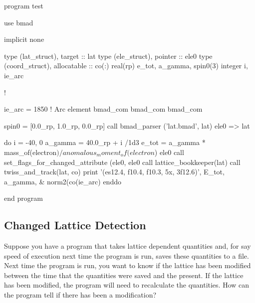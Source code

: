 \documentclass{hitec}     %
\begin{document}
\begin{code}
program test

use bmad

implicit none

type (lat_struct), target :: lat
type (ele_struct), pointer :: ele0
type (coord_struct), allocatable :: co(:)
real(rp) e_tot, a_gamma, spin0(3)
integer i, ie_arc

!

ie_arc = 1850   ! Arc element
bmad_com%
bmad_com%
bmad_com%

spin0 = [0.0_rp, 1.0_rp, 0.0_rp]
call bmad_parser ('lat.bmad', lat)
ele0 => lat%

do i = -40, 0
  a_gamma = 40.0_rp + i /1d3
  e_tot = a_gamma * mass_of(electron$) / anomalous_moment_of(electron$)
  ele0%
  call set_flags_for_changed_attribute (ele0, ele0%
  call lattice_bookkeeper(lat)
  call twiss_and_track(lat, co)
  print '(es12.4, f10.4, f10.3, 5x, 3f12.6)', E_tot, a_gamma, &
                          norm2(co(ie_arc)%
enddo

end program
\end{code}

\subsection{Changed Lattice Detection}

Suppose you have a program that takes lattice dependent quantities and, for say speed of execution
next time the program is run, saves these quantities to a file. Next time the program is run, you
want to know if the lattice has been modified between the time that the quantities were saved and
the present. If the lattice has been modified, the program will need to recalculate the
quantities. How can the program tell if there has been a modification?
\end{document}
